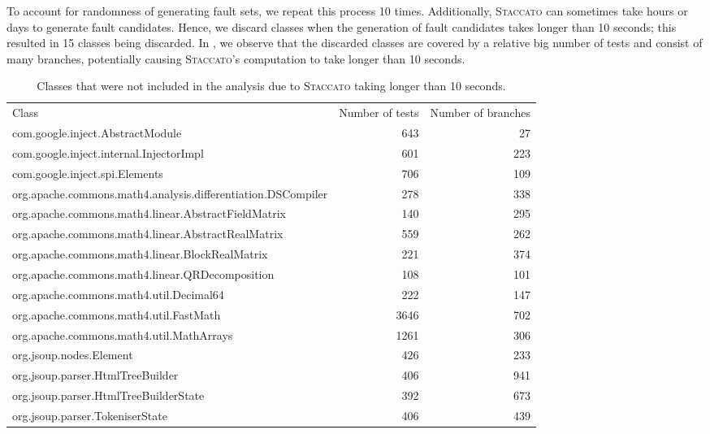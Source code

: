 \documentclass[twoside,a4paper,11pt]{memoir}
\begin{document}
To account for randomness of generating fault sets, we repeat this process 10 times.
Additionally, \textsc{Staccato} can sometimes take hours or days to generate fault candidates.
Hence, we discard classes when the generation of fault candidates takes longer than 10 seconds; this resulted in 15 classes being discarded.
In , we observe that the discarded classes are covered by a relative big number of tests and consist of many branches, potentially causing \textsc{Staccato}'s computation to take longer than 10 seconds.

\begin{table}[]
    \centering
    \caption{Classes that were not included in the analysis due to \textsc{Staccato} taking longer than 10 seconds.}%
    \label{tab:too_big}
    \begin{adjustbox}{center}
    \begin{tabular}{lrr}
        \toprule
        Class & Number of tests & Number of branches \\ \rowcolor{Gray}
        com.google.inject.AbstractModule & 643 & 27 \\ 
        com.google.inject.internal.InjectorImpl & 601 & 223 \\ \rowcolor{Gray}
        com.google.inject.spi.Elements & 706 & 109 \\ 
        org.apache.commons.math4.analysis.differentiation.DSCompiler & 278 & 338 \\ \rowcolor{Gray}
        org.apache.commons.math4.linear.AbstractFieldMatrix & 140 & 295 \\ 
        org.apache.commons.math4.linear.AbstractRealMatrix & 559 & 262 \\ \rowcolor{Gray}
        org.apache.commons.math4.linear.BlockRealMatrix & 221 & 374 \\ 
        org.apache.commons.math4.linear.QRDecomposition & 108 & 101 \\ \rowcolor{Gray}
        org.apache.commons.math4.util.Decimal64 & 222 & 147 \\ 
        org.apache.commons.math4.util.FastMath & 3646 & 702 \\ \rowcolor{Gray}
        org.apache.commons.math4.util.MathArrays & 1261 & 306 \\ 
        org.jsoup.nodes.Element & 426 & 233 \\ \rowcolor{Gray}
        org.jsoup.parser.HtmlTreeBuilder & 406 & 941 \\ 
        org.jsoup.parser.HtmlTreeBuilderState & 392 & 673 \\ \rowcolor{Gray}
        org.jsoup.parser.TokeniserState & 406 & 439 \\
        \bottomrule
    \end{tabular}
    \end{adjustbox}
\end{table}
\end{document}
